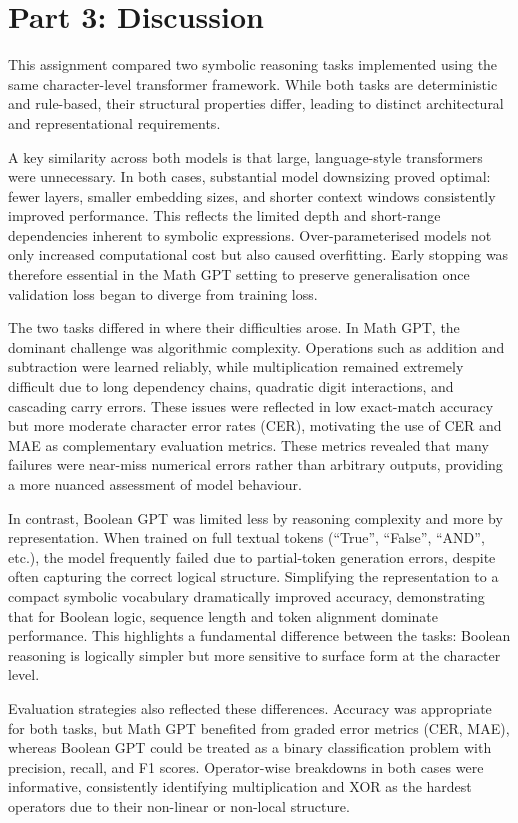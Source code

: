 \section{Part 3: Discussion}

This assignment compared two symbolic reasoning tasks implemented using the same character-level transformer framework. While both tasks are deterministic and rule-based, their structural properties differ, leading to distinct architectural and representational requirements.

A key similarity across both models is that large, language-style transformers were unnecessary. In both cases, substantial model downsizing proved optimal: fewer layers, smaller embedding sizes, and shorter context windows consistently improved performance. This reflects the limited depth and short-range dependencies inherent to symbolic expressions. Over-parameterised models not only increased computational cost but also caused overfitting. Early stopping was therefore essential in the Math GPT setting to preserve generalisation once validation loss began to diverge from training loss.

The two tasks differed in where their difficulties arose. In Math GPT, the dominant challenge was algorithmic complexity. Operations such as addition and subtraction were learned reliably, while multiplication remained extremely difficult due to long dependency chains, quadratic digit interactions, and cascading carry errors. These issues were reflected in low exact-match accuracy but more moderate character error rates (CER), motivating the use of CER and MAE as complementary evaluation metrics. These metrics revealed that many failures were near-miss numerical errors rather than arbitrary outputs, providing a more nuanced assessment of model behaviour.

In contrast, Boolean GPT was limited less by reasoning complexity and more by representation. When trained on full textual tokens (“True”, “False”, “AND”, etc.), the model frequently failed due to partial-token generation errors, despite often capturing the correct logical structure. Simplifying the representation to a compact symbolic vocabulary dramatically improved accuracy, demonstrating that for Boolean logic, sequence length and token alignment dominate performance. This highlights a fundamental difference between the tasks: Boolean reasoning is logically simpler but more sensitive to surface form at the character level.

Evaluation strategies also reflected these differences. Accuracy was appropriate for both tasks, but Math GPT benefited from graded error metrics (CER, MAE), whereas Boolean GPT could be treated as a binary classification problem with precision, recall, and F1 scores. Operator-wise breakdowns in both cases were informative, consistently identifying multiplication and XOR as the hardest operators due to their non-linear or non-local structure.


